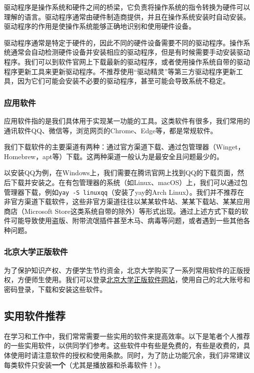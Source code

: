 \documentclass[../main.tex]{subfiles}
\begin{document}
驱动程序是操作系统和硬件之间的桥梁，它负责将操作系统的指令转换为硬件可以理解的语言。驱动程序通常由硬件制造商提供，并且在操作系统安装时自动安装。驱动程序的作用是使操作系统能够正确地识别和使用硬件设备。

驱动程序通常是特定于硬件的，因此不同的硬件设备需要不同的驱动程序。操作系统通常会自动检测硬件设备并安装相应的驱动程序，但是有时候需要手动安装驱动程序。我们可以到软件官网上下载最新的驱动程序，或者使用操作系统自带的驱动程序更新工具来更新驱动程序。不推荐使用“驱动精灵”等第三方驱动程序更新工具，因为它们可能会安装不必要的驱动程序，甚至可能会导致系统不稳定。

\subsubsection{应用软件}

应用软件指的是我们具体用于实现某一功能的工具。这类软件有很多，我们常用的通讯软件QQ、微信等，浏览网页的Chrome、Edge等，都是常规软件。

我们下载软件的主要渠道有两种：通过官方渠道下载、通过包管理器（Winget，Homebrew，apt等）下载。这两种渠道一般认为是最安全且问题最少的。

以安装QQ为例，在Windows上，我们需要在腾讯官网上找到QQ的下载页面，然后下载并安装之。在有包管理器的系统（如Linux、macOS）上，我们可以通过包管理器下载，例如\texttt{yay -S linuxqq}（安装了yay的Arch Linux）。我们并不推荐在非官方渠道下载软件，这些非官方渠道往往以某某软件站、某某下载站、某某应用商店（Microsoft Store这类系统自带的除外）等形式出现。通过上述方式下载的软件可能导致使用盗版、附带流氓插件甚至木马、病毒等问题，或者遇到一些其他各种问题。

\subsubsection{北京大学正版软件}

为了保护知识产权、方便学生节约资金，北京大学购买了一系列常用软件的正版授权，方便师生使用。我们可以登录\href{https://software.pku.edu.cn/}{北京大学正版软件网站}，使用自己的北大账号和密码登录，下载和安装这些软件。

\subsection{实用软件推荐}

在学习和工作中，我们常常需要一些实用的软件来提高效率。以下是笔者个人推荐的一些实用软件，以供同学们参考。这些软件中有些是免费的，有些是收费的，具体使用时请注意软件的授权和使用条款。同时，为了防止功能冗余，我们非常建议每类软件只安装\textbf{一个}（尤其是播放器和杀毒软件！）。
\end{document}
